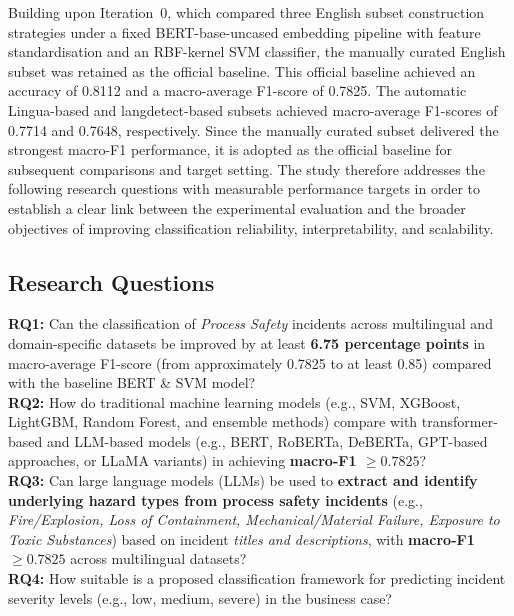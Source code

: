 \documentclass[11pt, titlepage, bibliography=totoc]{scrreprt}
\begin{document}
Building upon Iteration~0, which compared three English subset construction strategies under a fixed BERT-base-uncased embedding pipeline with feature standardisation and an RBF-kernel SVM classifier, the manually curated English subset was retained as the official baseline. This official baseline achieved an accuracy of 0.8112 and a macro-average F1-score of 0.7825. The automatic Lingua-based and langdetect-based subsets achieved macro-average F1-scores of 0.7714 and 0.7648, respectively. Since the manually curated subset delivered the strongest macro-F1 performance, it is adopted as the official baseline for subsequent comparisons and target setting. The study therefore addresses the following research questions with measurable performance targets in order to establish a clear link between the experimental evaluation and the broader objectives of improving classification reliability, interpretability, and scalability.

\subsection{Research Questions}


    \textbf{RQ1:} Can the classification of \textit{Process Safety} incidents across multilingual and domain-specific datasets be improved by at least \textbf{6.75 percentage points} in macro-average F1-score (from approximately 0.7825 to at least 0.85) compared with the baseline BERT \& SVM model?\\

    \textbf{RQ2:} How do traditional machine learning models (e.g., SVM, XGBoost, LightGBM, Random Forest, and ensemble methods) compare with transformer-based and LLM-based models (e.g., BERT, RoBERTa, DeBERTa, GPT-based approaches, or LLaMA variants) in achieving \textbf{macro-F1 $\geq 0.7825$}?\\

    \textbf{RQ3:} Can large language models (LLMs) be used to \textbf{extract and identify underlying hazard types from process safety incidents} (e.g., \textit{Fire/Explosion, Loss of Containment, Mechanical/Material Failure, Exposure to Toxic Substances}) based on incident \textit{titles and descriptions}, with \textbf{macro-F1 $\geq 0.7825$} across multilingual datasets?\\

    \textbf{RQ4:} How suitable is a proposed classification framework for predicting incident severity levels (e.g., low, medium, severe) in the business case?\\
\end{document}
